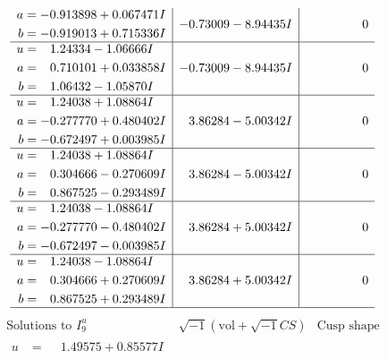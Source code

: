 \documentclass[1p]{elsarticle_modified}
\theoremstyle{definition}
\newcommand{\I}{\sqrt{-1}}
\begin{document}
$$\begin{array}{c|c|c}
\begin{aligned}
a &= -0.913898 + 0.067471 I \\
b &= -0.919013 + 0.715336 I\end{aligned}
 & -0.73009 - 8.94435 I & \phantom{-0.000000 } 0 \\ \hline\begin{aligned}
u &= \phantom{-}1.24334 - 1.06666 I \\
a &= \phantom{-}0.710101 + 0.033858 I \\
b &= \phantom{-}1.06432 - 1.05870 I\end{aligned}
 & -0.73009 - 8.94435 I & \phantom{-0.000000 } 0 \\ \hline\begin{aligned}
u &= \phantom{-}1.24038 + 1.08864 I \\
a &= -0.277770 + 0.480402 I \\
b &= -0.672497 + 0.003985 I\end{aligned}
 & \phantom{-}3.86284 - 5.00342 I & \phantom{-0.000000 } 0 \\ \hline\begin{aligned}
u &= \phantom{-}1.24038 + 1.08864 I \\
a &= \phantom{-}0.304666 - 0.270609 I \\
b &= \phantom{-}0.867525 - 0.293489 I\end{aligned}
 & \phantom{-}3.86284 - 5.00342 I & \phantom{-0.000000 } 0 \\ \hline\begin{aligned}
u &= \phantom{-}1.24038 - 1.08864 I \\
a &= -0.277770 - 0.480402 I \\
b &= -0.672497 - 0.003985 I\end{aligned}
 & \phantom{-}3.86284 + 5.00342 I & \phantom{-0.000000 } 0 \\ \hline\begin{aligned}
u &= \phantom{-}1.24038 - 1.08864 I \\
a &= \phantom{-}0.304666 + 0.270609 I \\
b &= \phantom{-}0.867525 + 0.293489 I\end{aligned}
 & \phantom{-}3.86284 + 5.00342 I & \phantom{-0.000000 } 0\\
 \hline 
 \end{array}$$\newpage$$\begin{array}{c|c|c}  
\text{Solutions to }I^u_{9}& \I (\text{vol} + \sqrt{-1}CS) & \text{Cusp shape}\\
 \hline 
\begin{aligned}
u &= \phantom{-}1.49575 + 0.85577 I \\

\end{aligned}
\end{array}$$
\end{document}
